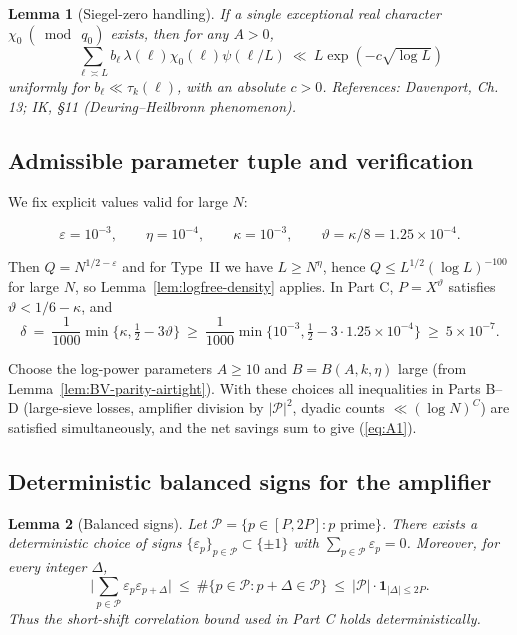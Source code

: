 \documentclass[11pt]{article}
\def\eqref#1{(\ref{#1})}%
\newtheorem{lemma}{Lemma}[part]
\theoremstyle{definition}
\theoremstyle{remark}
\numberwithin{equation}{part}
\begin{document}
\begin{lemma}[Siegel-zero handling]\label{lem:siegel}
	If a single exceptional real character $\chi_0\ (\bmod\ q_0)$ exists, then for any $A>0$,
	\[
		\sum_{\ell\asymp L} b_\ell\,\lambda(\ell)\chi_0(\ell)\psi(\ell/L)\ \ll\ L\exp(-c\sqrt{\log L})
	\]
	uniformly for $b_\ell\ll \tau_k(\ell)$, with an absolute $c>0$. References: Davenport, Ch. 13; IK, §11 (Deuring--Heilbronn phenomenon).
\end{lemma}

\subsection{Admissible parameter tuple and verification}

We fix explicit values valid for large $N$:

\[
	\varepsilon=10^{-3},\qquad \eta=10^{-4},\qquad \kappa=10^{-3},\qquad \vartheta=\kappa/8=1.25\times 10^{-4}.
\]

Then $Q=N^{1/2-\varepsilon}$ and for Type~II we have $L\ge N^{\eta}$, hence $Q\le L^{1/2}(\log L)^{-100}$ for large $N$, so Lemma~\ref{lem:logfree-density} applies. In Part C, $P=X^{\vartheta}$ satisfies $\vartheta<1/6-\kappa$, and
\[
	\delta\ =\ \frac1{1000}\min\{\kappa,\tfrac12-3\vartheta\}\ \ge\ \frac{1}{1000}\min\{10^{-3},\tfrac12-3\cdot 1.25\times 10^{-4}\}\ \ge\ 5\times 10^{-7}.
\]

Choose the log-power parameters $A\ge 10$ and $B=B(A,k,\eta)$ large (from Lemma~\ref{lem:BV-parity-airtight}). With these choices all inequalities in Parts B--D (large-sieve losses, amplifier division by $|\mathcal P|^2$, dyadic counts $\ll (\log N)^C$) are satisfied simultaneously, and the net savings sum to give \eqref{eq:A1}.

\subsection{Deterministic balanced signs for the amplifier}

\begin{lemma}[Balanced signs]\label{lem:balanced-signs}
	Let $\mathcal P=\{p\in[P,2P]: p\text{ prime}\}$. There exists a deterministic choice of signs $\{\varepsilon_p\}_{p\in\mathcal P}\subset\{\pm 1\}$ with $\sum_{p\in\mathcal P}\varepsilon_p=0$. Moreover, for every integer $\Delta$,
	\[
		\Big|\sum_{p\in\mathcal P}\varepsilon_p\varepsilon_{p+\Delta}\Big|\ \le\ \#\{p\in\mathcal P: p+\Delta\in\mathcal P\}\ \le\ |\mathcal P|\cdot \mathbf 1_{|\Delta|\le 2P}.
	\]
	Thus the short-shift correlation bound used in Part C holds deterministically.
\end{lemma}
\end{document}
